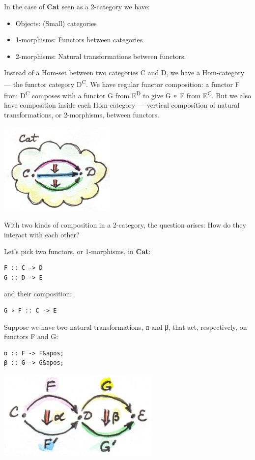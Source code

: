 In the case of \textbf{Cat} seen as a 2-category we have:

\begin{itemize}
\tightlist
\item
  Objects: (Small) categories
\item
  1-morphisms: Functors between categories
\item
  2-morphisms: Natural transformations between functors.
\end{itemize}

Instead of a Hom-set between two categories C and D, we have a
Hom-category --- the functor category D\textsuperscript{C}. We have
regular functor composition: a functor F from D\textsuperscript{C}
composes with a functor G from E\textsuperscript{D} to give G ∘ F from
E\textsuperscript{C}. But we also have composition inside each
Hom-category --- vertical composition of natural transformations, or
2-morphisms, between functors.

\includegraphics[width=2.25000in]{images/8_cat-2-cat.jpg}

With two kinds of composition in a 2-category, the question arises: How
do they interact with each other?

Let's pick two functors, or 1-morphisms, in \textbf{Cat}:

\begin{verbatim}
F :: C -> D
G :: D -> E
\end{verbatim}

and their composition:

\begin{verbatim}
G ∘ F :: C -> E
\end{verbatim}

Suppose we have two natural transformations, α and β, that act,
respectively, on functors F and G:

\begin{verbatim}
α :: F -> F&apos;
β :: G -> G&apos;
\end{verbatim}

\includegraphics[width=3.12500in]{images/10_horizontal.jpg}

